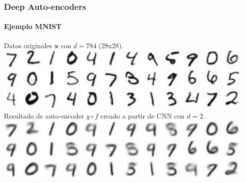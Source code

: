 \documentclass[aspectratio=169]{beamer}
\begin{document}
\begin{frame}[c]\frametitle{Deep Auto-encoders}\framesubtitle{Ejemplo MNIST}
  \vspace{-.2cm}
  \begin{center}
    Datos originales $\mathbf{x}$ con $d=784$ (28x28).\\
    \vspace{.2cm}
    \includegraphics[width=.35\textwidth, center]{imgs/tema4/aenc/ex_or.pdf}\\
    \vspace{.5cm}
    Resultado de auto-encoder $g \circ f$ creado a partir de CNN con $d=2$.\\
    \vspace{.2cm}
    \includegraphics[width=.35\textwidth, center]{imgs/tema4/aenc/ex_cnn_2.pdf}\\ 
  \end{center}    
\end{frame}

\end{document}
